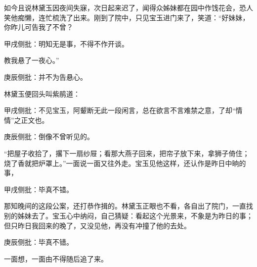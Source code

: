 \begin{parag}
    如今且说林黛玉因夜间失寐，次日起来迟了，闻得众姊妹都在园中作饯花会，恐人笑他痴懒，连忙梳洗了出来。刚到了院中，只见宝玉进门来了，笑道：“好妹妹，你昨儿可告我了不曾？\begin{note}甲戌侧批：明知无是事，不得不作开谈。\end{note}教我悬了一夜心。”\begin{note}庚辰侧批：并不为告悬心。\end{note}林黛玉便回头叫紫鹃道：\begin{note}甲戌侧批：不见宝玉，阿颦断无此一段闲言，总在欲言不言难禁之意，了却“情情”之正文也。\end{note}\begin{note}庚辰侧批：倒像不曾听见的。\end{note}“把屋子收拾了，撂下一扇纱屉；看那大燕子回来，把帘子放下来，拿狮子倚住；烧了香就把炉罩上。”一面说一面又往外走。宝玉见他这样，还认作是昨日中晌的事，\begin{note}甲戌侧批：毕真不错。\end{note}那知晚间的这段公案，还打恭作揖的。林黛玉正眼也不看，各自出了院门，一直找别的姊妹去了。宝玉心中纳闷，自己猜疑：看起这个光景来，不象是为昨日的事；但只昨日我回来的晚了，又没见他，再没有冲撞了他的去处。\begin{note}庚辰侧批：毕真不错。\end{note}一面想，一面由不得随后追了来。
\end{parag}


